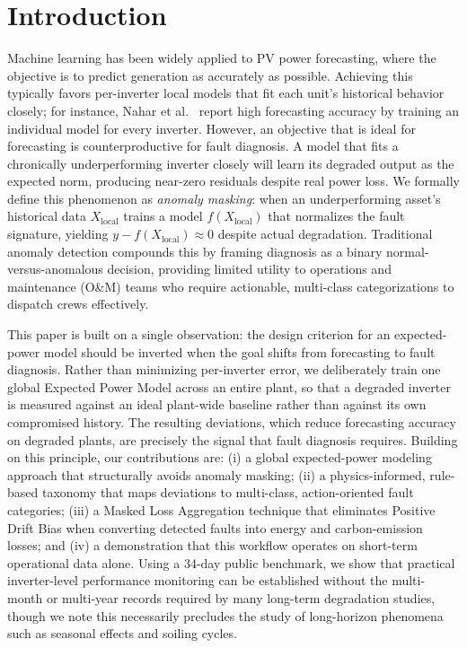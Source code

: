 \documentclass[11pt,a4paper,twoside]{article}
\begin{document}
\section{Introduction}

Machine learning has been widely applied to PV power forecasting, where the objective is to predict generation as accurately as possible. Achieving this typically favors per-inverter local models that fit each unit's historical behavior closely; for instance, Nahar et al.~\cite{nahar2025} report high forecasting accuracy by training an individual model for every inverter. However, an objective that is ideal for forecasting is counterproductive for fault diagnosis. A model that fits a chronically underperforming inverter closely will learn its degraded output as the expected norm, producing near-zero residuals despite real power loss. We formally define this phenomenon as \textit{anomaly masking}: when an underperforming asset's historical data $X_{\text{local}}$ trains a model $f(X_{\text{local}})$ that normalizes the fault signature, yielding $y - f(X_{\text{local}}) \approx 0$ despite actual degradation. Traditional anomaly detection compounds this by framing diagnosis as a binary normal-versus-anomalous decision, providing limited utility to operations and maintenance (O\&M) teams who require actionable, multi-class categorizations to dispatch crews effectively.

This paper is built on a single observation: the design criterion for an expected-power model should be inverted when the goal shifts from forecasting to fault diagnosis. Rather than minimizing per-inverter error, we deliberately train one global Expected Power Model across an entire plant, so that a degraded inverter is measured against an ideal plant-wide baseline rather than against its own compromised history. The resulting deviations, which reduce forecasting accuracy on degraded plants, are precisely the signal that fault diagnosis requires. Building on this principle, our contributions are: (i) a global expected-power modeling approach that structurally avoids anomaly masking; (ii) a physics-informed, rule-based taxonomy that maps deviations to multi-class, action-oriented fault categories; (iii) a Masked Loss Aggregation technique that eliminates Positive Drift Bias when converting detected faults into energy and carbon-emission losses; and (iv) a demonstration that this workflow operates on short-term operational data alone. Using a 34-day public benchmark, we show that practical inverter-level performance monitoring can be established without the multi-month or multi-year records required by many long-term degradation studies, though we note this necessarily precludes the study of long-horizon phenomena such as seasonal effects and soiling cycles.
\end{document}
